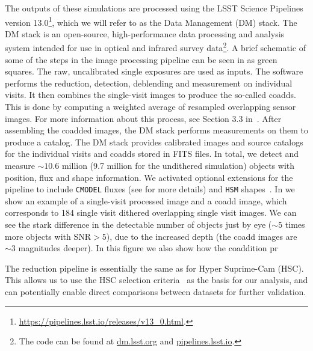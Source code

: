 \documentclass[a4paper,fleqn,usenatbib]{mnras}
\begin{document}
The outputs of these simulations are processed using the LSST Science Pipelines~\citep{Overview,ScienceBook,WhitePaper,2015arXiv151207914J,2018PASJ...70S...5B} version 13.0\footnote{\url{https://pipelines.lsst.io/releases/v13_0.html}.}, which we will refer to as the Data Management (DM) stack. The DM stack is an open-source, high-performance data processing and analysis system intended for use in optical and infrared survey data\footnote{The code can be found at \url{dm.lsst.org} and \url{pipelines.lsst.io}.}. A brief schematic of some of the steps in the image processing pipeline can be seen in  as green squares. The raw, uncalibrated single exposures are used as inputs. The software performs the reduction, detection, deblending and measurement on individual visits. It then combines the single-visit images to produce the so-called coadds. This is done by computing a weighted average of resampled overlapping sensor images. For more information about this process, see Section 3.3 in~\citet{2018PASJ...70S...5B}. After assembling the coadded images, the DM stack performs measurements on them to produce a catalog. The DM stack provides calibrated images and source catalogs for the individual visits and coadds stored in FITS files. In total, we detect and measure $\sim 10.6$ million  (9.7 million for the undithered simulation) objects with position, flux and shape information. We activated optional extensions for the pipeline to include \texttt{CMODEL} fluxes (see \citealt{2018PASJ...70S...5B} for more details) and \texttt{HSM} shapes~\citep{2003MNRAS.343..459H,2005MNRAS.361.1287M}. In  we show an example of a single-visit processed image and a coadd image, which corresponds to 184 single visit dithered overlapping single visit images. We can see the stark difference in the detectable number of objects just by eye ($\sim 5$ times more objects with SNR$>5$), due to the increased depth (the coadd images are $\sim 3$ magnitudes deeper). In this figure we also show how the coaddition pr

The reduction pipeline is essentially the same as for Hyper Suprime-Cam (HSC). This allows us to use the HSC selection criteria~\citep[Sec. 5.1]{2018PASJ...70S..25M} as the basis for our analysis, and can potentially enable direct comparisons between datasets for further validation.
\end{document}
